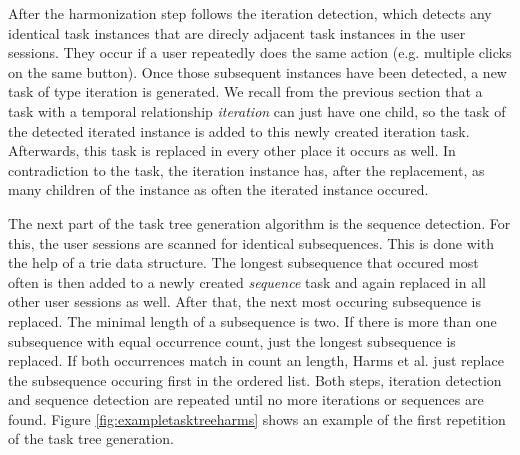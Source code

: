 After the harmonization step follows the iteration detection, which detects any identical task instances that are direcly adjacent task instances in the user sessions. They occur if a user repeatedly does the same action (e.g. multiple clicks on the same button).
Once those subsequent instances have been detected, a new task of type iteration is generated.
We recall from the previous section that a task with a temporal relationship \textit{iteration} can just have one child, so the task of the detected iterated instance is added to this newly created iteration task.
Afterwards, this task is replaced in every other place it occurs as well.
In contradiction to the task, the iteration instance has, after the replacement, as many children of the instance as often the iterated instance occured.

The next part of the task tree generation algorithm is the sequence detection.
For this, the user sessions are scanned for identical subsequences. This is done with the help of a trie data structure.
The longest subsequence that occured most often is then added to a newly created \textit{sequence} task and again replaced in
all other user sessions as well. After that, the next most occuring subsequence is replaced. The minimal length of a subsequence is two.
If there is more than one subsequence with equal occurrence count, just the longest subsequence is replaced.
If both occurrences match in count an length, Harms et al. just replace the subsequence occuring first in the ordered list.
Both steps, iteration detection and sequence detection are repeated until no more iterations or sequences are found.
Figure \ref{fig:exampletasktreeharms} shows an example of the first repetition of the task tree generation.

